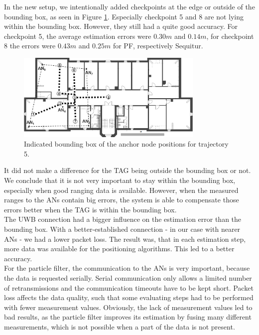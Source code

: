 In the new setup, we intentionally added checkpoints at the edge or outside of the bounding box, as seen in Figure \ref{fig:trajectory5_boundingBox}. Especially checkpoint 5 and 8 are not lying within the bounding box. However, they still had a quite good accuracy. For checkpoint 5, the average estimation errors were $0.30m$ and $0.14m$, for checkpoint 8 the errors were $0.43m$ and $0.25m$ for PF, respectively Sequitur.
\begin{figure}[th]
\centering
\includegraphics[width=0.8\textwidth]{Figures/trajectory5_boundingBox}
\decoRule
\caption[Trajectory 5 with Bounding Box]{Indicated bounding box of the anchor node positions for trajectory 5.}
\label{fig:trajectory5_boundingBox}
\end{figure}
It did not make a difference for the TAG being outside the bounding box or not. We conclude that it is not very important to stay within the bounding box, especially when good ranging data is available. However, when the measured ranges to the ANs contain big errors, the system is able to compensate those errors better when the TAG is within the bounding box. \\
\noindent\hspace*{5mm}%
The UWB connection had a bigger influence on the estimation error than the bounding box. With a better-established connection - in our case with nearer ANs - we had a lower packet loss. The result was, that in each estimation step, more data was available for the positioning algorithms. This led to a better accuracy.\\
For the particle filter, the communication to the ANs is very important, because the data is requested serially. Serial communication only allows a limited number of retransmissions and the communication timeouts have to be kept short. Packet loss affects the data quality, such that some evaluating steps had to be performed with fewer measurement values. Obviously, the lack of measurement values led to bad results, as the particle filter improves its estimation by fusing many different measurements, which is not possible when a part of the data is not present.